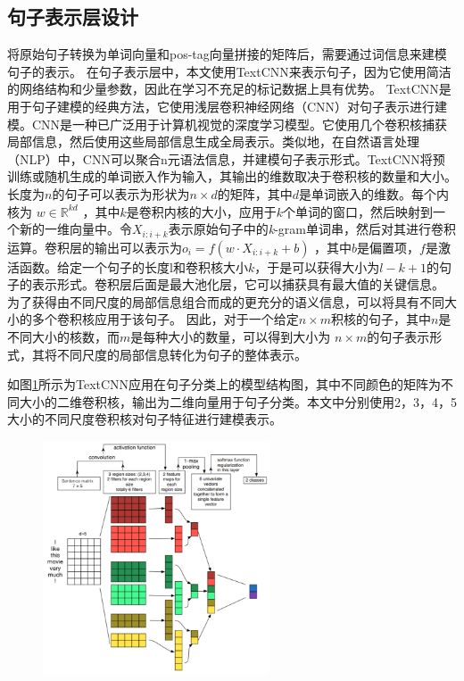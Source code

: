 \subsection{句子表示层设计}
将原始句子转换为单词向量和pos-tag向量拼接的矩阵后，需要通过词信息来建模句子的表示。
在句子表示层中，本文使用TextCNN\cite{kim2014convolutional}来表示句子，因为它使用简洁的网络结构和少量参数，因此在学习不充足的标记数据上具有优势。
TextCNN是用于句子建模的经典方法，它使用浅层卷积神经网络（CNN）\cite{krizhevsky2012imagenet}对句子表示进行建模。CNN是一种已广泛用于计算机视觉的深度学习模型。它使用几个卷积核捕获局部信息，然后使用这些局部信息生成全局表示。类似地，在自然语言处理（NLP）中，CNN可以聚合n元语法信息，并建模句子表示形式。TextCNN将预训练或随机生成的单词嵌入作为输入，其输出的维数取决于卷积核的数量和大小。长度为$n$的句子可以表示为形状为$n\times d$的矩阵，其中$d$是单词嵌入的维数。每个内核为 $w \in \mathbb{R}^{kd}$ ，其中$k$是卷积内核的大小，应用于$k$个单词的窗口，然后映射到一个新的一维向量中。令$X_{i:i+k}$表示原始句子中的\textit{k}-gram单词串，然后对其进行卷积运算。卷积层的输出可以表示为$o_i=f(w\cdot X_{i:i+k} + b)$ ，其中$b$是偏置项，$f$是激活函数。给定一个句子的长度l和卷积核大小$k$，于是可以获得大小为$l-k+1$的句子的表示形式。卷积层后面是最大池化层，它可以捕获具有最大值的关键信息。
为了获得由不同尺度的局部信息组合而成的更充分的语义信息，可以将具有不同大小的多个卷积核应用于该句子。 因此，对于一个给定$n \times m$积核的句子，其中$n$是不同大小的核数，而$m$是每种大小的数量，可以得到大小为 $n\times m$的句子表示形式，其将不同尺度的局部信息转化为句子的整体表示。

如图\ref{fig:textcnn}所示为TextCNN应用在句子分类上的模型结构图，其中不同颜色的矩阵为不同大小的二维卷积核，输出为二维向量用于句子分类。本文中分别使用2，3，4，5大小的不同尺度卷积核对句子特征进行建模表示。
\begin{figure}[htb]
    \centering
    \includegraphics[width=0.6\textwidth]{Img/textcnn.png}
    \label{fig:textcnn}
\end{figure}

